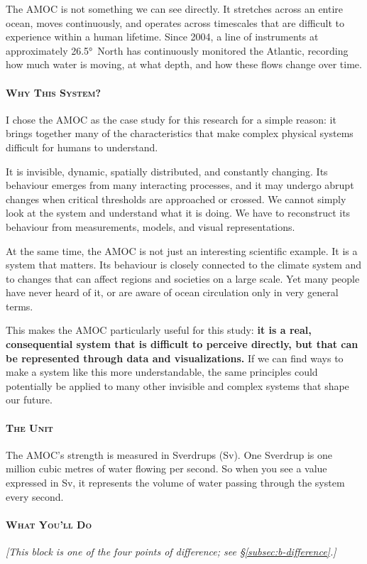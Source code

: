 The AMOC is not something we can see directly. It stretches across an entire ocean, moves
continuously, and operates across timescales that are difficult to experience within a human
lifetime. Since 2004, a line of instruments at approximately \ang{26.5}~North has continuously
monitored the Atlantic, recording how much water is moving, at what depth, and how these flows
change over time.

\paragraph{\textsc{Why This System?}}
I chose the AMOC as the case study for this research for a simple reason: it brings together
many of the characteristics that make complex physical systems difficult for humans to
understand.

It is invisible, dynamic, spatially distributed, and constantly changing. Its behaviour
emerges from many interacting processes, and it may undergo abrupt changes when critical
thresholds are approached or crossed. We cannot simply look at the system and understand what
it is doing. We have to reconstruct its behaviour from measurements, models, and visual
representations.

At the same time, the AMOC is not just an interesting scientific example. It is a system that
matters. Its behaviour is closely connected to the climate system and to changes that can
affect regions and societies on a large scale. Yet many people have never heard of it, or are
aware of ocean circulation only in very general terms.

This makes the AMOC particularly useful for this study: \textbf{it is a real, consequential
system that is difficult to perceive directly, but that can be represented through data and
visualizations.} If we can find ways to make a system like this more understandable, the same
principles could potentially be applied to many other invisible and complex systems that shape
our future.

\paragraph{\textsc{The Unit}}
The AMOC's strength is measured in Sverdrups (Sv). One Sverdrup is one million cubic metres of
water flowing per second. So when you see a value expressed in Sv, it represents the volume of
water passing through the system every second.

\paragraph{\textsc{What You'll Do}}
\emph{[This block is one of the four points of difference; see \S\ref{subsec:b-difference}.]}

